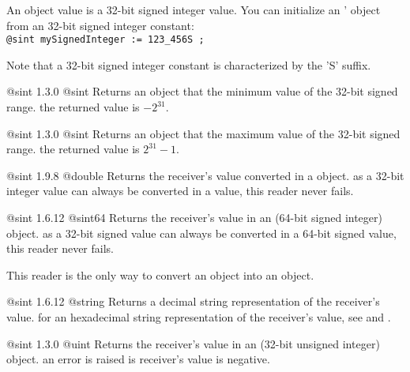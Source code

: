 
An  object value is a 32-bit signed integer value. You can initialize an ' object from an 32-bit signed integer constant:\\

\texttt{@sint mySignedInteger := 123\_456S ;}

Note that a 32-bit signed integer constant is characterized by the 'S' suffix.




{@sint}
{1.3.0}
{@sint}
{Returns an  object that the minimum value of the 32-bit signed range.}
{the returned value is $-2^{31}$.}





{@sint}
{1.3.0}
{@sint}
{Returns an  object that the maximum value of the 32-bit signed range.}
{the returned value is $2^{31}-1$.}





{@sint}
{1.9.8}
{@double}
{Returns the receiver's value converted in a  object.}
{as a 32-bit integer value can always be converted in a  value, this reader never fails.}





{@sint}
{1.6.12}
{@sint64}
{Returns the receiver's value in an  (64-bit signed integer) object.}
{as a 32-bit signed value can always be converted in a 64-bit signed value, this reader never fails.}

This reader is the only way to convert an  object into an  object.





{@sint}
{1.6.12}
{@string}
{Returns a decimal string representation of the receiver's value.}
{for an hexadecimal string representation of the receiver's value, see  and .}







{@sint}
{1.3.0}
{@uint}
{Returns the receiver's value in an  (32-bit unsigned integer) object.}
{an error is raised is receiver's value is negative.}

